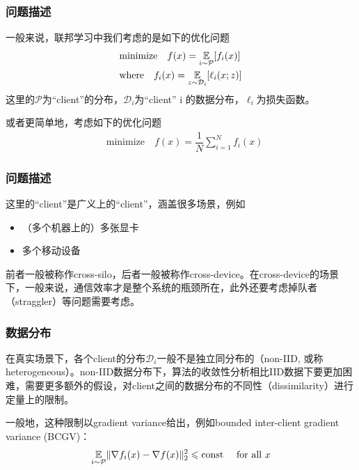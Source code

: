 \begin{frame}
\frametitle{问题描述}

一般来说，联邦学习中我们考虑的是如下的优化问题
\begin{align*}
    & \text{minimize} \quad f(x) = \operatorname*{\mathbb{E}}\limits_{i \sim {\mathcal{P}}} [f_i(x)] \\
    & \text{where} \quad f_i(x) = \operatorname*{\mathbb{E}}\limits_{z \sim \mathcal{D}_i} [\ell_i(x; z)]
\end{align*}
这里的$\mathcal{P}$为``client''的分布，$\mathcal{D}_i$为``client'' i 的数据分布，$\ell_i$为损失函数。

\pause
\vspace{1em}

或者更简单地，考虑如下的优化问题
\begin{align*}
    & \text{minimize} \quad f(x) = \dfrac{1}{N} \sum\limits_{i=1}^N f_i(x)
\end{align*}

\end{frame}


\begin{frame}
\frametitle{问题描述}

这里的``client''是广义上的``client''，涵盖很多场景，例如
\begin{itemize}
    \item （多个机器上的）多张显卡
    \item 多个移动设备
\end{itemize}

\pause
\vspace{1.5em}

前者一般被称作cross-silo，后者一般被称作cross-device。在cross-device的场景下，一般来说，通信效率才是整个系统的瓶颈所在，此外还要考虑掉队者（straggler）等问题需要考虑。

\end{frame}


\begin{frame}
\frametitle{数据分布}

在真实场景下，各个client的分布$\mathcal{D}_i$一般不是独立同分布的（non-IID, 或称heterogeneous）。non-IID数据分布下，算法的收敛性分析相比IID数据下要更加困难，需要更多额外的假设，对client之间的数据分布的不同性（dissimilarity）进行定量上的限制。

\vspace{1.5em}

一般地，这种限制以gradient variance给出，例如bounded inter-client gradient variance (BCGV)：
$$\operatorname*{\mathbb{E}}\limits_{i \sim {\mathcal{P}}} \lVert \nabla f_i(x) - \nabla f(x) \rVert_2^2 \leqslant \text{const} \quad \text{ for all } x$$

\end{frame}

